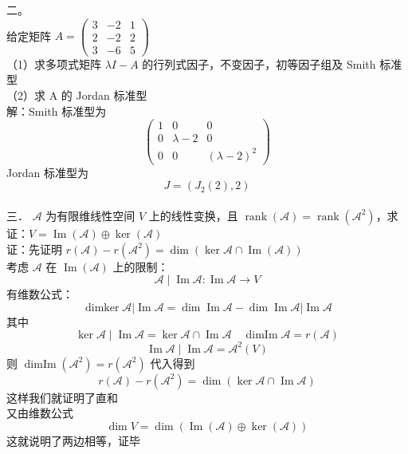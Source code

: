 \documentclass[UTF8]{ctexart}
\begin{document}
\noindent 二。\\
给定矩阵 $A=\left(\begin{array}{lll}3 & -2 & 1 \\ 2 & -2 & 2 \\ 3 & -6 & 5\end{array}\right)$\\
（1）求多项式矩阵 $\lambda I-A$ 的行列式因子，不变因子，初等因子组及 Smith 标准型\\
（2）求 A 的 Jordan 标准型\\
解：Smith 标准型为
 $$\left(\begin{array}{ccc}1 & 0 & 0 \\ 0 & \lambda-2 & 0 \\ 0 & 0 & (\lambda-2)^{2}\end{array}\right)$$
Jordan 标准型为 
$$J=\left(J_{2}(2), 2\right)$$\\



\noindent 三． $\mathcal{A}$ 为有限维线性空间 $V$ 上的线性变换，且 $\operatorname{rank}(\mathcal{A})=\operatorname{rank}\left(\mathcal{A}^{2}\right)$，求证：$V=\operatorname{Im}(\mathcal{A}) \oplus \operatorname{ker}(\mathcal{A})$\\
证：先证明 $r(\mathcal{A})-r\left(\mathcal{A}^{2}\right)=\operatorname{dim}(\operatorname{ker} \mathcal{A} \cap \operatorname{Im}(\mathcal{A}))$\\
考虑 $\mathcal{A}$ 在 $\operatorname{Im}(\mathcal{A})$ 上的限制： $$\mathcal{A} \mid \operatorname{Im} \mathcal{A}: \operatorname{Im} \mathcal{A} \rightarrow V$$
有维数公式： 
$$\operatorname{dimker} \mathcal{A}|\operatorname{Im} \mathcal{A}=\operatorname{dim} \operatorname{Im} \mathcal{A}-\operatorname{dim} \operatorname{Im} \mathcal{A}| \operatorname{Im} \mathcal{A}$$
其中 
$$\operatorname{ker} \mathcal{A} \mid \operatorname{Im} \mathcal{A}=\operatorname{ker} \mathcal{A} \cap \operatorname{Im} \mathcal{A} \quad \operatorname{dimIm} \mathcal{A}=r(\mathcal{A})$$
$$\operatorname{Im} \mathcal{A} \mid \operatorname{Im} \mathcal{A}=\mathcal{A}^{2}(V)$$
则 $\operatorname{dimIm}\left(\mathcal{A}^{2}\right)=r\left(\mathcal{A}^{2}\right)$
代入得到 $$r(\mathcal{A})-r\left(\mathcal{A}^{2}\right)=\operatorname{dim}(\operatorname{ker} \mathcal{A} \cap \operatorname{Im} \mathcal{A})$$
这样我们就证明了直和\\
又由维数公式 $$\operatorname{dim} V=\operatorname{dim}(\operatorname{Im}(\mathcal{A}) \oplus \operatorname{ker}(\mathcal{A}))$$这就说明了两边相等，证毕\\
\end{document}
